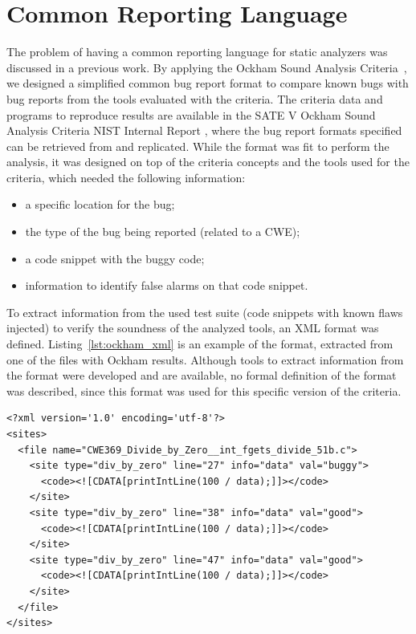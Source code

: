 \section{Common Reporting Language}

The problem of having a common reporting language for static analyzers was
discussed in a previous work. By applying the Ockham Sound Analysis
Criteria~\cite{black_sate_2016}, we designed a simplified common bug report
format to compare known bugs with bug reports from the tools evaluated with the
criteria. The criteria data and programs to reproduce results are available in
the SATE V Ockham Sound Analysis Criteria NIST Internal Report
\cite{black_sate_2016}, where the bug report formats specified can be retrieved
from and replicated. While the format was fit to perform the analysis, it was
designed on top of the criteria concepts and the tools used for the criteria,
which needed the following information:

\begin{itemize}
\item a specific location for the bug;
\item the type of the bug being reported (related to a CWE);
\item a code snippet with the buggy code;
\item information to identify false alarms on that code snippet.
\end{itemize}

To extract information from the used test suite (code snippets with known
flaws injected) to verify the soundness of the analyzed tools, an XML
format was defined. Listing~\ref{lst:ockham_xml} is an example of the format,
extracted from one of the files with Ockham results.  Although tools to extract
information from the format were developed and are available, no formal
definition of the format was described, since this format was used for this
specific version of the criteria.

\begin{lstlisting}[caption={Ockham Criteria XML bug report example},label={lst:ockham_xml}]
<?xml version='1.0' encoding='utf-8'?>
<sites>
  <file name="CWE369_Divide_by_Zero__int_fgets_divide_51b.c">
    <site type="div_by_zero" line="27" info="data" val="buggy">
      <code><![CDATA[printIntLine(100 / data);]]></code>
    </site>
    <site type="div_by_zero" line="38" info="data" val="good">
      <code><![CDATA[printIntLine(100 / data);]]></code>
    </site>
    <site type="div_by_zero" line="47" info="data" val="good">
      <code><![CDATA[printIntLine(100 / data);]]></code>
    </site>
  </file>
</sites>
\end{lstlisting}


